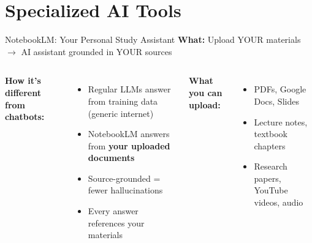 \documentclass[aspectratio=169]{beamer}
\begin{document}
\section{Specialized AI Tools}

\begin{frame}{NotebookLM: Your Personal Study Assistant}
\small
\textbf{\color{popblue}What:} Upload YOUR materials $\to$ AI assistant grounded in YOUR sources

\smallskip
\begin{columns}[T]
\textbf{How it's different from chatbots:}
\begin{itemize}\setlength\itemsep{0em}
  \item Regular LLMs answer from training data (generic internet)
  \item NotebookLM answers from \textbf{your uploaded documents}
  \item Source-grounded = fewer hallucinations
  \item Every answer references your materials
\end{itemize}

\smallskip
\textbf{What you can upload:}
\begin{itemize}\setlength\itemsep{0em}
  \item PDFs, Google Docs, Slides
  \item Lecture notes, textbook chapters
  \item Research papers, YouTube videos, audio
\end{itemize}

\end{columns}
\end{frame}
\end{document}
